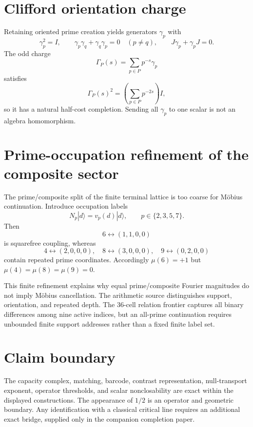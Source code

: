 \documentclass[11pt,a4paper]{article}
\begin{document}
\section{Clifford orientation charge}
Retaining oriented prime creation yields generators $\gamma_p$ with
\begin{equation}
\gamma_p^2=I,\qquad \gamma_p\gamma_q+\gamma_q\gamma_p=0\quad(p\ne q),\qquad J\gamma_p+\gamma_pJ=0.
\end{equation}
The odd charge
\begin{equation}
\Gamma_P(s)=\sum_{p\in P}p^{-s}\gamma_p
\end{equation}
satisfies
\begin{equation}
\Gamma_P(s)^2=\left(\sum_{p\in P}p^{-2s}\right)I,
\end{equation}
so it has a natural half-cost completion. Sending all $\gamma_p$ to one scalar is not an algebra homomorphism.

\section{Prime-occupation refinement of the composite sector}
The prime/composite split of the finite terminal lattice is too coarse for M\"obius continuation. Introduce occupation labels
\begin{equation}
N_p|d\rangle=v_p(d)|d\rangle,
\qquad p\in\{2,3,5,7\}.
\end{equation}
Then
\begin{equation}
6\leftrightarrow(1,1,0,0)
\end{equation}
is squarefree coupling, whereas
\begin{equation}
4\leftrightarrow(2,0,0,0),\quad8\leftrightarrow(3,0,0,0),\quad9\leftrightarrow(0,2,0,0)
\end{equation}
contain repeated prime coordinates. Accordingly $\mu(6)=+1$ but $\mu(4)=\mu(8)=\mu(9)=0$.

This finite refinement explains why equal prime/composite Fourier magnitudes do not imply M\"obius cancellation. The arithmetic source distinguishes support, orientation, and repeated depth. The 36-cell relation frontier captures all binary differences among nine active indices, but an all-prime continuation requires unbounded finite support addresses rather than a fixed finite label set.

\section{Claim boundary}
The capacity complex, matching, barcode, contrast representation, null-transport exponent, operator thresholds, and scalar nonclosability are exact within the displayed constructions. The appearance of $1/2$ is an operator and geometric boundary. Any identification with a classical critical line requires an additional exact bridge, supplied only in the companion completion paper.
\end{document}
